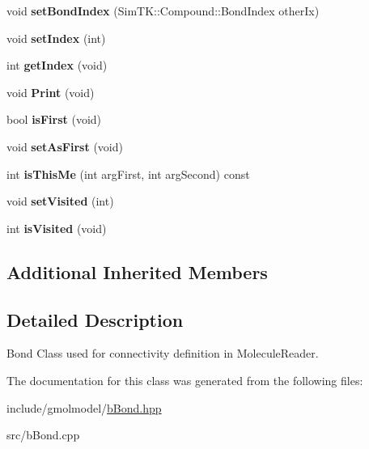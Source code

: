 \begin{DoxyCompactItemize}
\item 
void {\bfseries set\+Bond\+Index} (Sim\+T\+K\+::\+Compound\+::\+Bond\+Index other\+Ix)\hypertarget{classbBond_a81dd4c869c5d8fd841ce8edda2a42efa}{}\label{classbBond_a81dd4c869c5d8fd841ce8edda2a42efa}

\item 
void {\bfseries set\+Index} (int)\hypertarget{classbBond_a5b084292de272b7f6752183a275719c9}{}\label{classbBond_a5b084292de272b7f6752183a275719c9}

\item 
int {\bfseries get\+Index} (void)\hypertarget{classbBond_ac85ff74475b2b00206acd69a1a09481c}{}\label{classbBond_ac85ff74475b2b00206acd69a1a09481c}

\item 
void {\bfseries Print} (void)\hypertarget{classbBond_a23a5f3abe2f6a867e7343ef32f09d168}{}\label{classbBond_a23a5f3abe2f6a867e7343ef32f09d168}

\item 
bool {\bfseries is\+First} (void)\hypertarget{classbBond_a056c61e9e3238ff555dc041ec595ee80}{}\label{classbBond_a056c61e9e3238ff555dc041ec595ee80}

\item 
void {\bfseries set\+As\+First} (void)\hypertarget{classbBond_ab84068eecf02ee75a018181034f4c57b}{}\label{classbBond_ab84068eecf02ee75a018181034f4c57b}

\item 
int {\bfseries is\+This\+Me} (int arg\+First, int arg\+Second) const \hypertarget{classbBond_a6374cfb4c4081e0e0784f09958e29673}{}\label{classbBond_a6374cfb4c4081e0e0784f09958e29673}

\item 
void {\bfseries set\+Visited} (int)\hypertarget{classbBond_a7f14e680287b1533fbc1bdacb65cff0a}{}\label{classbBond_a7f14e680287b1533fbc1bdacb65cff0a}

\item 
int {\bfseries is\+Visited} (void)\hypertarget{classbBond_ac57204f3a8799bd71cf2b990c77d4bcb}{}\label{classbBond_ac57204f3a8799bd71cf2b990c77d4bcb}

\end{DoxyCompactItemize}
\subsection*{Additional Inherited Members}


\subsection{Detailed Description}
Bond Class used for connectivity definition in Molecule\+Reader. 

The documentation for this class was generated from the following files\+:\begin{DoxyCompactItemize}
\item 
include/gmolmodel/\hyperlink{bBond_8hpp}{b\+Bond.\+hpp}\item 
src/b\+Bond.\+cpp\end{DoxyCompactItemize}
